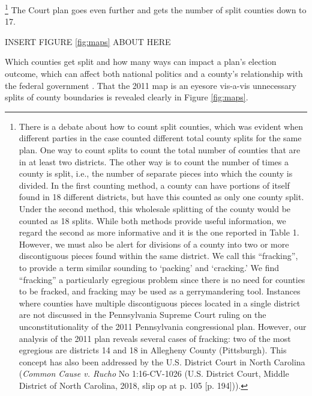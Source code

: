         \footnote{There is a debate about how to count split counties, which was evident when different parties in the case counted different total county splits for the same plan. One way to count splits to count the total number of counties that are in at least two districts. The other way is to count the number of times a county is split, i.e., the number of separate pieces into which the county is divided. In the first counting method, a county can have portions of itself found in 18 different districts, but have this counted as only one county split. Under the second method, this wholesale splitting of the county would be counted as 18 splits. While both methods provide useful information, we regard the second as more informative and it is the one reported in Table 1. However, we must also be alert for divisions of a county into two or more discontiguous pieces found within the same district. We call this “fracking”, to provide a term similar sounding to ‘packing’ and ‘cracking.’ We find “fracking” a particularly egregious problem since there is no need for counties to be fracked, and fracking may be used as a gerrymandering tool. Instances where counties have multiple discontiguous pieces located in a single district are not discussed in the Pennsylvania Supreme Court ruling on the unconstitutionality of the 2011 Pennsylvania congressional plan. However, our analysis of the 2011 plan reveals several cases of fracking: two of the most egregious are districts 14 and 18 in Allegheny County (Pittsburgh). This concept has also been addressed by the U.S. District Court in North Carolina (\textit{Common Cause v. Rucho} No 1:16-CV-1026 (U.S. District Court, Middle District of North Carolina, 2018, slip op at p. 105 [p. 194])).}
    The Court plan goes even further and gets the number of split counties down to 17.

 \begin{center} INSERT FIGURE \ref{fig:maps} ABOUT HERE \end{center}
\par
    Which counties get split and how many ways can impact a plan’s election outcome, which can affect both national politics and a county's relationship with the federal government \citep{Ansolabehere2002a}. That the 2011 map is an eyesore vis-a-vis unnecessary splits of county boundaries is revealed clearly in Figure \ref{fig:maps}.
%
